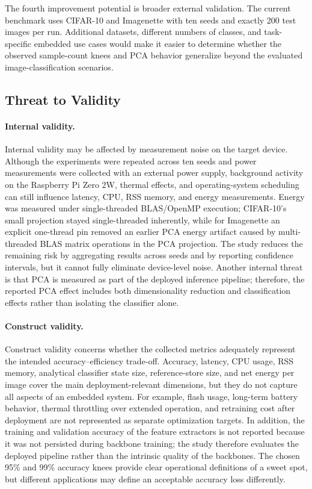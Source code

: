 \documentclass[sigconf,review]{acmart}
\begin{document}
The fourth improvement potential is broader external validation.
The current benchmark uses CIFAR-10 and Imagenette with ten seeds and exactly 200 test images per run.
Additional datasets, different numbers of classes, and task-specific embedded use cases would make it easier to determine whether the observed sample-count knees and PCA behavior generalize beyond the evaluated image-classification scenarios.

\subsection{Threat to Validity}
\paragraph{Internal validity.}
Internal validity may be affected by measurement noise on the target device.
Although the experiments were repeated across ten seeds and power measurements were collected with an external power supply, background activity on the Raspberry Pi Zero 2W, thermal effects, and operating-system scheduling can still influence latency, CPU, RSS memory, and energy measurements.
Energy was measured under single-threaded BLAS/OpenMP execution; CIFAR-10's small projection stayed single-threaded inherently, while for Imagenette an explicit one-thread pin removed an earlier PCA energy artifact caused by multi-threaded BLAS matrix operations in the PCA projection.
The study reduces the remaining risk by aggregating results across seeds and by reporting confidence intervals, but it cannot fully eliminate device-level noise.
Another internal threat is that PCA is measured as part of the deployed inference pipeline; therefore, the reported PCA effect includes both dimensionality reduction and classification effects rather than isolating the classifier alone.

\paragraph{Construct validity.}
Construct validity concerns whether the collected metrics adequately represent the intended accuracy--efficiency trade-off.
Accuracy, latency, CPU usage, RSS memory, analytical classifier state size, reference-store size, and net energy per image cover the main deployment-relevant dimensions, but they do not capture all aspects of an embedded system.
For example, flash usage, long-term battery behavior, thermal throttling over extended operation, and retraining cost after deployment are not represented as separate optimization targets.
In addition, the training and validation accuracy of the feature extractors is not reported because it was not persisted during backbone training; the study therefore evaluates the deployed pipeline rather than the intrinsic quality of the backbones.
The chosen 95\% and 99\% accuracy knees provide clear operational definitions of a sweet spot, but different applications may define an acceptable accuracy loss differently.
\end{document}
